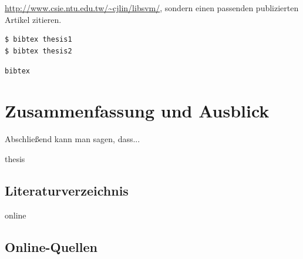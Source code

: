 \documentclass[11pt,a4paper]{report}
\begin{document}
\url{http://www.csie.ntu.edu.tw/~cjlin/libsvm/}, 
sondern einen passenden publizierten Artikel zitieren.

\begin{verbatim}
$ bibtex thesis1
$ bibtex thesis2
\end{verbatim}
\verb|bibtex|


\chapter{Zusammenfassung und Ausblick} \label{chap:fazit}

Abschließend kann man sagen, dass...

\newpage


\begin{btSect}{thesis} %
\section*{Literaturverzeichnis}
\btPrintCited
\end{btSect}
\begin{btSect}{online}
\section*{Online-Quellen}
\btPrintCited
\end{btSect}
\end{document}
